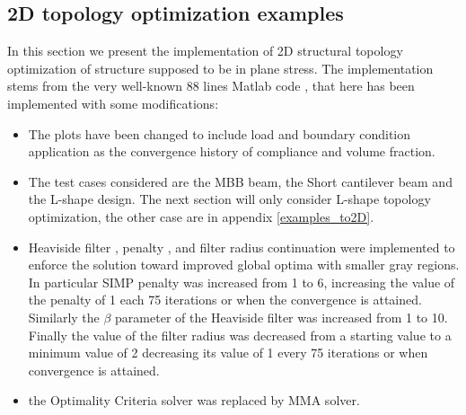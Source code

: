 \subsection{2D topology optimization examples}
In this section we present the implementation of 2D structural topology optimization of structure supposed to be in plane stress. The implementation stems from the very well-known 88 lines Matlab code \cite{andreassen2011efficient}, that here has been implemented with some modifications:
\begin{itemize}
\item The plots have been changed to include load and boundary condition application as the convergence history of compliance and volume fraction. 
\item The test cases considered are the MBB beam, the Short cantilever beam and the L-shape design. The next section will only consider L-shape topology optimization, the other case are in appendix \ref{examples_to2D}.
\item Heaviside filter \cite{lazarov2011filters}, penalty \cite{allaire1993numerical,allaire1993topology}, and filter radius \cite{sigmund1997design,sigmund1997designb} continuation were implemented to enforce the solution toward improved global optima with smaller gray regions.
In particular SIMP penalty was increased from 1 to 6, increasing the value of the penalty of 1 each 75 iterations or when the convergence is attained.
Similarly the $\beta$ parameter of the Heaviside filter was increased from 1 to 10.  Finally the value of the filter radius was decreased from a starting value to a minimum value of 2 decreasing its value of 1 every 75 iterations or when convergence is attained.
\item the Optimality Criteria solver was replaced by MMA solver.
\end{itemize}
